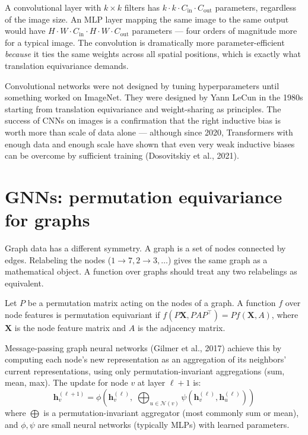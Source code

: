 A convolutional layer with $k \times k$ filters has $k \cdot k \cdot C_{\text{in}} \cdot C_{\text{out}}$ parameters, regardless of the image size. An MLP layer mapping the same image to the same output would have $H \cdot W \cdot C_{\text{in}} \cdot H \cdot W \cdot C_{\text{out}}$ parameters --- four orders of magnitude more for a typical image. The convolution is dramatically more parameter-efficient \emph{because} it ties the same weights across all spatial positions, which is exactly what translation equivariance demands.

\begin{aitip}
Convolutional networks were not designed by tuning hyperparameters until something worked on ImageNet. They were designed by Yann LeCun in the 1980s starting from translation equivariance and weight-sharing as principles. The success of CNNs on images is a confirmation that the right inductive bias is worth more than scale of data alone --- although since 2020, Transformers with enough data and enough scale have shown that even very weak inductive biases can be overcome by sufficient training (Dosovitskiy et al., 2021).
\end{aitip}

\section{GNNs: permutation equivariance for graphs}

Graph data has a different symmetry. A graph is a set of nodes connected by edges. Relabeling the nodes ($1 \to 7, 2 \to 3, \ldots$) gives the same graph as a mathematical object. A function over graphs should treat any two relabelings as equivalent.

\begin{definition}
Let $P$ be a permutation matrix acting on the nodes of a graph. A function $f$ over node features is permutation equivariant if $f(P \bm{X}, P A P^\top) = P f(\bm{X}, A)$, where $\bm{X}$ is the node feature matrix and $A$ is the adjacency matrix.
\end{definition}

Message-passing graph neural networks (Gilmer et al., 2017) achieve this by computing each node's new representation as an aggregation of its neighbors' current representations, using only permutation-invariant aggregations (sum, mean, max). The update for node $v$ at layer $\ell+1$ is:
\[
\bm{h}_v^{(\ell+1)} = \phi\!\left( \bm{h}_v^{(\ell)}, \; \bigoplus_{u \in \mathcal{N}(v)} \psi(\bm{h}_v^{(\ell)}, \bm{h}_u^{(\ell)}) \right)
\]
where $\bigoplus$ is a permutation-invariant aggregator (most commonly sum or mean), and $\phi, \psi$ are small neural networks (typically MLPs) with learned parameters.

